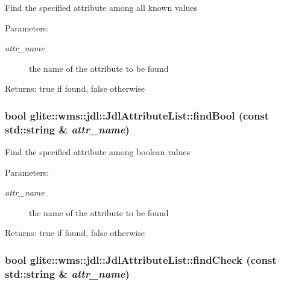 Find the specified attribute among all known values \begin{Desc}
\item[Parameters:]
\begin{description}
\item[{\em attr\_\-name}]the name of the attribute to be found \end{description}
\end{Desc}
\begin{Desc}
\item[Returns:]true if found, false otherwise \end{Desc}
\hypertarget{classglite_1_1wms_1_1jdl_1_1JdlAttributeList_a2}{
\subsubsection[findBool]{\setlength{\rightskip}{0pt plus 5cm}bool glite::wms::jdl::Jdl\-Attribute\-List::find\-Bool (const std::string \& {\em attr\_\-name})}}
\label{classglite_1_1wms_1_1jdl_1_1JdlAttributeList_a2}


Find the specified attribute among boolean values \begin{Desc}
\item[Parameters:]
\begin{description}
\item[{\em attr\_\-name}]the name of the attribute to be found \end{description}
\end{Desc}
\begin{Desc}
\item[Returns:]true if found, false otherwise \end{Desc}
\hypertarget{classglite_1_1wms_1_1jdl_1_1JdlAttributeList_a9}{
\subsubsection[findCheck]{\setlength{\rightskip}{0pt plus 5cm}bool glite::wms::jdl::Jdl\-Attribute\-List::find\-Check (const std::string \& {\em attr\_\-name})}}
\label{classglite_1_1wms_1_1jdl_1_1JdlAttributeList_a9}


